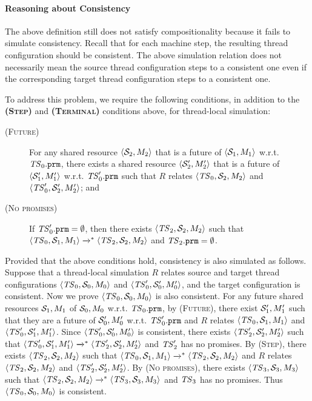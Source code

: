 \paragraph{Reasoning about Consistency}

The above definition still does not satisfy compositionality because it fails to simulate
consistency.  Recall that for each machine step, the resulting thread configuration should be
consistent.  The above simulation relation does not necessarily mean the source thread configuration
steps to a consistent one even if the corresponding target thread configuration steps to a
consistent one.

To address this problem, we require the following conditions, in addition to the
\textbf{\textsc{(Step)}} and \textbf{\textsc{(Terminal)}} conditions above, for thread-local
simulation:
%
\begin{center}
  \begin{minipage}{0.9\textwidth}
    \begin{description}
    \item[\textsc{(Future)}] For any shared resource ${\langle{{\cal S}_2,M_2}\rangle}$ that is a future of
      ${\langle{{\cal S}_1,M_1}\rangle}$ w.r.t. $\mathit{TS}_0.\texttt{prm}$, there exists a shared resource
      ${\langle{{\cal S}'_2,M'_2}\rangle}$ that is a future of ${\langle{{\cal S}'_1,M'_1}\rangle}$ w.r.t. $\mathit{TS}'_0.\texttt{prm}$
      such that $R$ relates ${\langle{\mathit{TS}_0,{\cal S}_2,M_2}\rangle}$ and ${\langle{\mathit{TS}'_0,{\cal S}'_2,M'_2}\rangle}$; and
    \item[\textsc{(No promises)}] If $\mathit{TS}'_0.\texttt{prm} = \emptyset$, then there exists
      ${\langle{\mathit{TS}_2,{\cal S}_2,M_2}\rangle}$ such that
      ${\langle{\mathit{TS}_0,{\cal S}_1,M_1}\rangle} \xrightarrow{}^* {\langle{\mathit{TS}_2,{\cal S}_2,M_2}\rangle}$ and
      $\mathit{TS}_2.\texttt{prm} = \emptyset$.
    \end{description}
  \end{minipage}
\end{center}
%
\noindent Provided that the above conditions hold, consistency is also simulated as follows.
Suppose that a thread-local simulation $R$ relates source and target thread configurations
${\langle{\mathit{TS}_0,{\cal S}_0,M_0}\rangle}$ and ${\langle{\mathit{TS}'_0,{\cal S}'_0,M'_0}\rangle}$, and the target configuration is
consistent.  Now we prove ${\langle{\mathit{TS}_0,{\cal S}_0,M_0}\rangle}$ is also consistent.  For any future shared
resources ${\cal S}_1,M_1$ of ${\cal S}_0,M_0$ w.r.t. $\mathit{TS}_0.\texttt{prm}$, by \textsc{(Future)}, there
exist ${\cal S}'_1,M'_1$ such that they are a future of ${\cal S}'_0,M'_0$ w.r.t. $\mathit{TS}'_0.\texttt{prm}$
and $R$ relates ${\langle{\mathit{TS}_0,{\cal S}_1,M_1}\rangle}$ and ${\langle{\mathit{TS}'_0,{\cal S}'_1,M'_1}\rangle}$.  Since
${\langle{\mathit{TS}'_0,{\cal S}'_0,M'_0}\rangle}$ is consistent, there exists ${\langle{\mathit{TS}'_2,{\cal S}'_2,M'_2}\rangle}$ such
that ${\langle{\mathit{TS}'_0,{\cal S}'_1,M'_1}\rangle} \xrightarrow{}^* {\langle{\mathit{TS}'_2,{\cal S}'_2,M'_2}\rangle}$ and $\mathit{TS}'_2$ has no
promises.  By \textsc{(Step)}, there exists ${\langle{\mathit{TS}_2,{\cal S}_2,M_2}\rangle}$ such that
${\langle{\mathit{TS}_0,{\cal S}_1,M_1}\rangle} \xrightarrow{}^* {\langle{\mathit{TS}_2,{\cal S}_2,M_2}\rangle}$ and $R$ relates
${\langle{\mathit{TS}_2,{\cal S}_2,M_2}\rangle}$ and ${\langle{\mathit{TS}'_2,{\cal S}'_2,M'_2}\rangle}$.  By \textsc{(No promises)},
there exists ${\langle{\mathit{TS}_3,{\cal S}_3,M_3}\rangle}$ such that
${\langle{\mathit{TS}_2,{\cal S}_2,M_2}\rangle} \xrightarrow{}^* {\langle{\mathit{TS}_3,{\cal S}_3,M_3}\rangle}$ and $\mathit{TS}_3$ has no promises.
Thus ${\langle{\mathit{TS}_0,{\cal S}_0,M_0}\rangle}$ is consistent.

